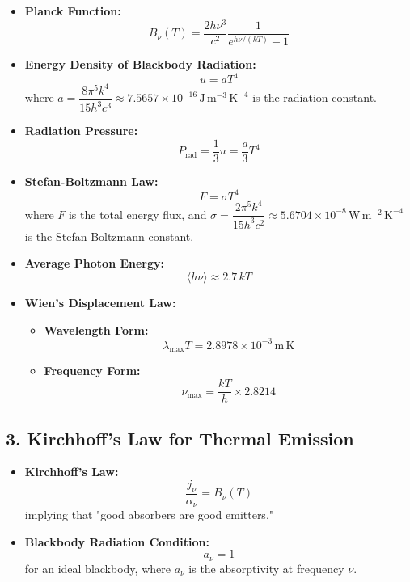 \documentclass{article}
\begin{document}
\begin{itemize}
    \item \textbf{Planck Function:}
          \[
              B_\nu(T) = \frac{2h\nu^3}{c^2} \frac{1}{e^{h\nu/(kT)} - 1}
          \]
    \item \textbf{Energy Density of Blackbody Radiation:}
          \[
              u = a T^4
          \]
          where \( a = \dfrac{8\pi^5 k^4}{15 h^3 c^3} \approx 7.5657 \times 10^{-16} \, \mathrm{J\,m^{-3}\,K^{-4}} \) is the radiation constant.
    \item \textbf{Radiation Pressure:}
          \[
              P_{\text{rad}} = \frac{1}{3} u = \frac{a}{3} T^4
          \]
    \item \textbf{Stefan-Boltzmann Law:}
          \[
              F = \sigma T^4
          \]
          where \( F \) is the total energy flux, and \( \sigma = \dfrac{2\pi^5 k^4}{15 h^3 c^2} \approx 5.6704 \times 10^{-8} \, \mathrm{W\,m^{-2}\,K^{-4}} \) is the Stefan-Boltzmann constant.
    \item \textbf{Average Photon Energy:}
          \[
              \langle h\nu \rangle \approx 2.7\,kT
          \]
    \item \textbf{Wien's Displacement Law:}
          \begin{itemize}
              \item \textbf{Wavelength Form:}
                    \[
                        \lambda_{\text{max}} T = 2.8978 \times 10^{-3} \, \mathrm{m\,K}
                    \]
              \item \textbf{Frequency Form:}
                    \[
                        \nu_{\text{max}} = \frac{k T}{h} \times 2.8214
                    \]
          \end{itemize}
\end{itemize}

\subsection*{3. Kirchhoff's Law for Thermal Emission}

\begin{itemize}
    \item \textbf{Kirchhoff's Law:}
          \[
              \frac{j_\nu}{\alpha_\nu} = B_\nu(T)
          \]
          implying that "good absorbers are good emitters."
    \item \textbf{Blackbody Radiation Condition:}
          \[
              a_\nu = 1
          \]
          for an ideal blackbody, where \( a_\nu \) is the absorptivity at frequency \( \nu \).
\end{itemize}
\end{document}
